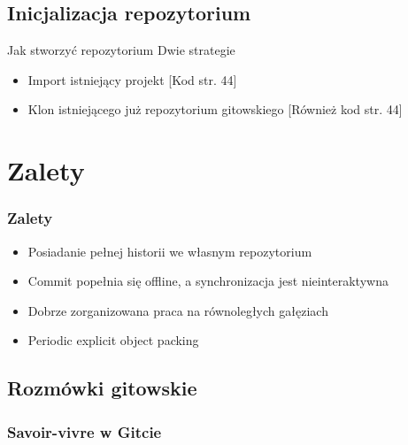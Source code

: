 \documentclass{beamer}
\begin{document}
\subsection{Inicjalizacja repozytorium}
\begin{frame}{Jak stworzyć repozytorium}
 Dwie strategie
 \begin{itemize}
  \item Import istniejący projekt
  [Kod str. 44]
  \item Klon istniejącego już repozytorium gitowskiego
  [Również kod str. 44]
 \end{itemize}
\end{frame}

\section{Zalety}

\begin{frame}
\frametitle{Zalety}
\begin{itemize}
 \item Posiadanie pełnej historii we własnym repozytorium
 \item Commit popełnia się offline, a synchronizacja jest nieinteraktywna
 \item Dobrze zorganizowana praca na równoległych gałęziach
 \item Periodic explicit object packing
\end{itemize}
 
\end{frame}

\subsection{Rozmówki gitowskie}
\begin{frame}
 \frametitle{Savoir-vivre w Gitcie}
\end{frame}
\end{document}
